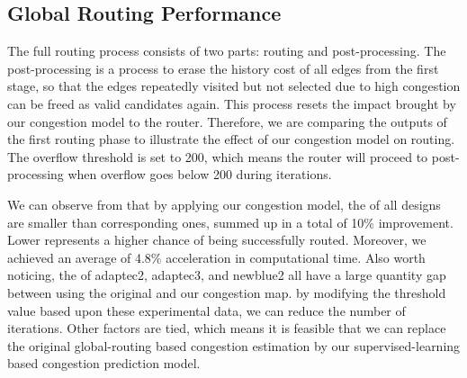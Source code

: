 \subsection{Global Routing Performance}
The full routing process consists of two parts: routing and post-processing. The post-processing is a process to erase the history cost of all edges from the first stage, so that the edges repeatedly visited but not selected due to high congestion can be freed as valid candidates again. This process resets the impact brought by our congestion model to the router. Therefore, we are comparing the outputs of the first routing phase to illustrate the effect of our congestion model on routing. The overflow threshold is set to 200, which means the router will proceed to post-processing when overflow goes below 200 during iterations.

We can observe from  that by applying our congestion model, the  of all designs are smaller than corresponding ones, summed up in a total of 10\% improvement. Lower  represents a higher chance of being successfully routed. Moreover, we achieved an average of 4.8\% acceleration in computational time. Also worth noticing, the  of adaptec2, adaptec3, and newblue2 all have a large quantity gap between using the original and our congestion map. by modifying the threshold value based upon these experimental data, we can reduce the number of iterations. Other factors are tied, which means it is feasible that we can replace the original global-routing based congestion estimation by our supervised-learning based congestion prediction model.


